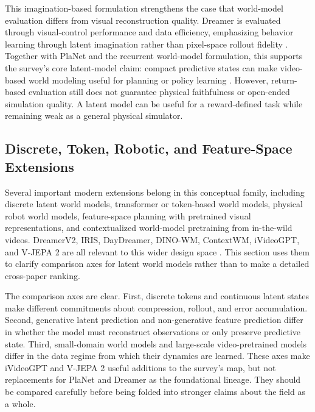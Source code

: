 This imagination-based formulation strengthens the case that world-model evaluation differs from visual reconstruction quality. Dreamer is evaluated through visual-control performance and data efficiency, emphasizing behavior learning through latent imagination rather than pixel-space rollout fidelity \cite{hafner2020_dreamer_prov}. Together with PlaNet and the recurrent world-model formulation, this supports the survey's core latent-model claim: compact predictive states can make video-based world modeling useful for planning or policy learning \cite{ha2018_world_models_prov,hafner2019_planet_prov,hafner2020_dreamer_prov}. However, return-based evaluation still does not guarantee physical faithfulness or open-ended simulation quality. A latent model can be useful for a reward-defined task while remaining weak as a general physical simulator.

\subsection{Discrete, Token, Robotic, and Feature-Space Extensions}

Several important modern extensions belong in this conceptual family, including discrete latent world models, transformer or token-based world models, physical robot world models, feature-space planning with pretrained visual representations, and contextualized world-model pretraining from in-the-wild videos. DreamerV2, IRIS, DayDreamer, DINO-WM, ContextWM, iVideoGPT, and V-JEPA 2 are all relevant to this wider design space \cite{hafner2021_dreamerv2_prov,micheli2023_iris_prov,wu2022_daydreamer_prov,zhou2025_dino_wm_prov,wu2023_contextwm_prov,wu2024ivideogpt,assran2025vjepa2_prov}. This section uses them to clarify comparison axes for latent world models rather than to make a detailed cross-paper ranking.

The comparison axes are clear. First, discrete tokens and continuous latent states make different commitments about compression, rollout, and error accumulation. Second, generative latent prediction and non-generative feature prediction differ in whether the model must reconstruct observations or only preserve predictive state. Third, small-domain world models and large-scale video-pretrained models differ in the data regime from which their dynamics are learned. These axes make iVideoGPT and V-JEPA 2 useful additions to the survey's map, but not replacements for PlaNet and Dreamer as the foundational lineage. They should be compared carefully before being folded into stronger claims about the field as a whole.

